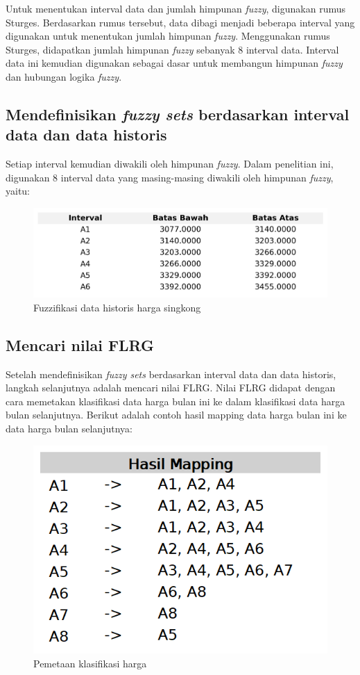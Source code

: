 \documentclass[conference]{IEEEtran}
\begin{document}
Untuk menentukan interval data dan jumlah himpunan \textit{fuzzy}, digunakan rumus Sturges. Berdasarkan rumus tersebut, data dibagi menjadi beberapa interval yang digunakan untuk menentukan jumlah himpunan \textit{fuzzy}. Menggunakan rumus Sturges, didapatkan jumlah himpunan \textit{fuzzy} sebanyak 8 interval data. Interval data ini kemudian digunakan sebagai dasar untuk membangun himpunan \textit{fuzzy} dan hubungan logika \textit{fuzzy}.



\subsection{Mendefinisikan \textit{fuzzy sets} berdasarkan interval data dan data historis}
Setiap interval kemudian diwakili oleh himpunan \textit{fuzzy}. Dalam penelitian ini, digunakan 8 interval data yang masing-masing diwakili oleh himpunan \textit{fuzzy}, yaitu:
\begin{figure}[H]
    \centering
    \includegraphics[scale=0.55]{images/intervals_table.jpg} 
    \caption{Fuzzifikasi data historis harga singkong}
\end{figure}

\subsection{Mencari nilai FLRG}
Setelah mendefinisikan \textit{fuzzy sets} berdasarkan interval data dan data historis, langkah selanjutnya adalah mencari nilai FLRG. Nilai FLRG didapat dengan cara memetakan klasifikasi data harga bulan ini ke dalam klasifikasi data harga bulan selanjutnya. Berikut adalah contoh hasil mapping data harga bulan ini ke data harga bulan selanjutnya:

\begin{figure}[H]
    \centering
    \includegraphics[scale=0.4]{images/hasil_mapping.png} 
    \caption{Pemetaan klasifikasi harga}
\end{figure}
\end{document}
